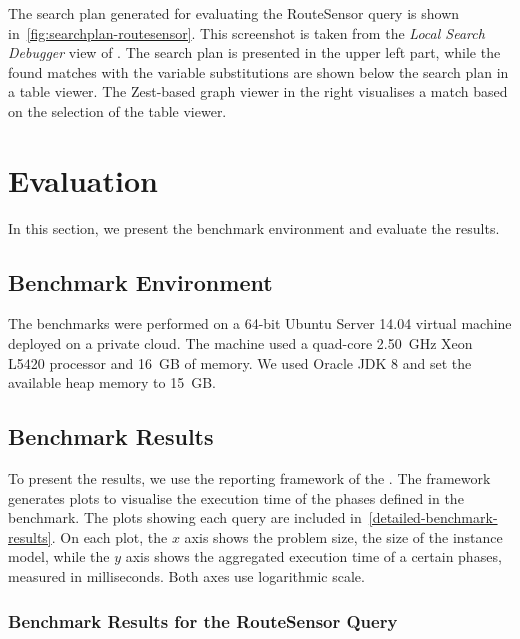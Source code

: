\documentclass[submission,copyright,creativecommons]{eptcs}
\begin{document}
The search plan generated for evaluating the \textsf{RouteSensor} query is shown in~\autoref{fig:searchplan-routesensor}. This screenshot is taken from the \emph{Local Search Debugger} view of \eiq. The search plan is presented in the upper left part, while the found matches with the variable substitutions are shown below the search plan in a table viewer. The Zest-based graph viewer in the right visualises a match based on the selection of the table viewer.

\section{Evaluation}

In this section, we present the benchmark environment and evaluate the results. %

\subsection{Benchmark Environment}

The benchmarks were performed on a 64-bit Ubuntu Server 14.04 virtual machine deployed on a private cloud. The machine used a quad-core 2.50~GHz Xeon L5420 processor and 16~GB of memory. We used Oracle JDK 8 and set the available heap memory to 15~GB.

\subsection{Benchmark Results}
\label{benchmark-results}

To present the results, we use the reporting framework of the \tb. The framework generates plots to visualise the execution time of the phases defined in the benchmark. %
The plots showing each query are included in~\autoref{detailed-benchmark-results}. On each plot, the $x$ axis shows the problem size, \ie the size of the instance model, while the $y$ axis shows the aggregated execution time of a certain phases, measured in milliseconds. Both axes use logarithmic scale.

\subsubsection{Benchmark Results for the \textsf{RouteSensor} Query}
\end{document}
